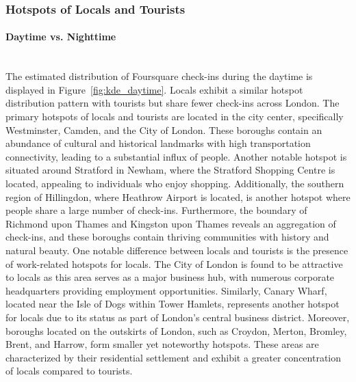 \documentclass{article}
\newcommand{\subsubsubsection}[1]{\paragraph{#1}\mbox{}\\}
\theoremstyle{remark}
\begin{document}
\subsubsection{Hotspots of Locals and Tourists} \label{hotspots}

\subsubsubsection{Daytime vs. Nighttime}
The estimated distribution of Foursquare check-ins during the daytime is displayed in Figure~\ref{fig:kde_daytime}. Locals exhibit a similar hotspot distribution pattern with tourists but share fewer check-ins across London. The primary hotspots of locals and tourists are located in the city center, specifically Westminster, Camden, and the City of London. These boroughs contain an abundance of cultural and historical landmarks with high transportation connectivity, leading to a substantial influx of people. Another notable hotspot is situated around Stratford in Newham, where the Stratford Shopping Centre is located, appealing to individuals who enjoy shopping. Additionally, the southern region of Hillingdon, where Heathrow Airport is located, is another hotspot where people share a large number of check-ins. Furthermore, the boundary of Richmond upon Thames and Kingston upon Thames reveals an aggregation of check-ins, and these boroughs contain thriving communities with history and natural beauty. One notable difference between locals and tourists is the presence of work-related hotspots for locals. The City of London is found to be attractive to locals as this area serves as a major business hub, with numerous corporate headquarters providing employment opportunities. Similarly, Canary Wharf, located near the Isle of Dogs within Tower Hamlets, represents another hotspot for locals due to its status as part of London's central business district. Moreover, boroughs located on the outskirts of London, such as Croydon, Merton, Bromley, Brent, and Harrow, form smaller yet noteworthy hotspots. These areas are characterized by their residential settlement and exhibit a greater concentration of locals compared to tourists.
\end{document}

